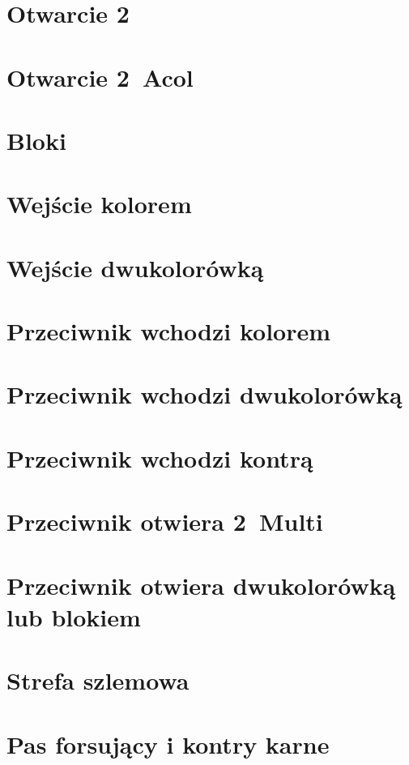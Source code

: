 \documentclass[12pt, a4paper]{article}
\begin{document}
\section{Otwarcie 2\ntx}
\section{Otwarcie 2\clubs\ Acol}
\section{Bloki}
\section{Wejście kolorem}
\section{Wejście dwukolorówką}
\section{Przeciwnik wchodzi kolorem}
\section{Przeciwnik wchodzi dwukolorówką}
\section{Przeciwnik wchodzi kontrą}
\section{Przeciwnik otwiera 2\diams\ Multi}
\section{Przeciwnik otwiera dwukolorówką lub blokiem}
\section{Strefa szlemowa}
\section{Pas forsujący i kontry karne}
\end{document}
